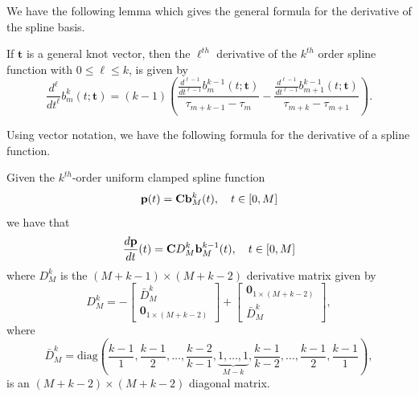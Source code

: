 We have the following lemma which gives the general formula for the derivative of the spline basis.
\begin{lemma}\label{lem:derivative_basis_functions}
If $\mathbf{t}$ is a general knot vector, then the $\ell^{th}$ derivative of the $k^{th}$ order spline function with  $0\leq \ell \leq k$, is given by
\[
\frac{d^\ell}{dt^\ell}b_m^k(t; \mathbf{t}) = (k-1)\left(\frac{\frac{d^{\ell-1}}{dt^{\ell-1}}b_m^{k-1}(t; \mathbf{t})}{\tau_{m+k-1}-\tau_m} - \frac{\frac{d^{\ell-1}}{dt^{\ell-1}}b_{m+1}^{k-1}(t; \mathbf{t})}{\tau_{m+k}-\tau_{m+1}} \right).
\]	
\end{lemma}

Using vector notation, we have the following formula for the derivative of a spline function.
\begin{lemma} \label{lem:derivative_of_spline}
Given the $k^{th}$-order uniform clamped spline function
\[
\mathbf{p}(t) = \mathbf{C} \mathbf{b}_M^k(t), \quad t\in[0, M]
\]
we have that
\[
\frac{d\mathbf{p}}{dt}(t) = \mathbf{C} D_M^k \mathbf{b}_M^{k-1}(t), \quad t\in[0, M]
\]	
where $D_M^k$ is the $(M+k-1)\times (M+k-2)$ derivative matrix given by
\begin{equation}\label{eq:D_k}
D_M^k = -\begin{bmatrix}\bar{D}_M^k \\ \mathbf{0}_{1\times(M+k-2)} \end{bmatrix} + \begin{bmatrix}\mathbf{0}_{1\times(M+k-2)} \\ \bar{D}_M^k \end{bmatrix},
\end{equation}
where
\begin{equation}\label{eq:D_k_bar}
\bar{D}_M^k = \text{diag}\left(\frac{k-1}{1}, \frac{k-1}{2}, \dots, \frac{k-2}{k-1}, \underbrace{1, \dots, 1}_{M-k}, \frac{k-1}{k-2}, \dots, \frac{k-1}{2}, \frac{k-1}{1}\right),
\end{equation}
is an $(M+k-2)\times(M+k-2)$ diagonal matrix.
\end{lemma}
